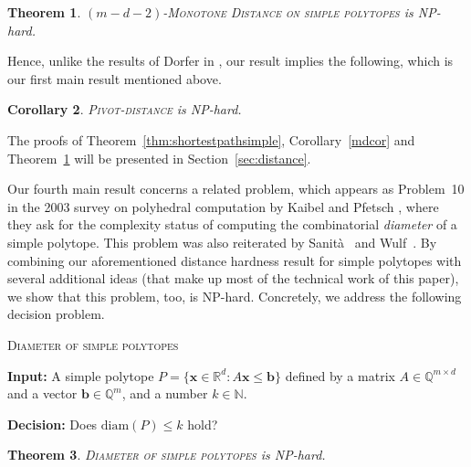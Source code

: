 \documentclass[centering,11pt,reqno]{amsart}
\newtheorem{theorem}{Theorem}[section]
\newtheorem{cor}[theorem]{Corollary}
\theoremstyle{definition}
\newcommand{\NP}{\textsc{NP}}
\begin{document}
\begin{theorem}
\label{thm:monotone}
$(m-d-2)$-\textsc{Monotone Distance on simple polytopes} is \NP-hard.
\end{theorem}
Hence, unlike the results of Dorfer in \cite{associahedronhard}, our result implies the following, which is our first main result mentioned above.

\begin{cor}
\label{cor:minimalpivots}
\textsc{Pivot-distance} is \NP-hard. 
\end{cor}

The proofs of Theorem~\ref{thm:shortestpathsimple}, Corollary~\ref{mdcor} and Theorem~\ref{thm:monotone} will be presented in Section~\ref{sec:distance}.

Our fourth main result concerns a related problem, which appears as Problem~10 in the 2003 survey on polyhedral computation by Kaibel and Pfetsch \cite{KaibelPfetschSurvey}, where they ask for the complexity status of computing the combinatorial \emph{diameter} of a simple polytope. This problem was also reiterated by Sanit\`{a}~\cite{Sanita18} and Wulf~\cite{HarderthanNPHard}. By combining our aforementioned distance hardness result for simple polytopes with several additional ideas (that make up most of the technical work of this paper), we show that this problem, too, is \NP-hard. Concretely, we address the following decision problem.

\medskip

\begin{mdframed}[innerleftmargin=0.5em, innertopmargin=0.5em, innerrightmargin=0.5em, innerbottommargin=0.5em, userdefinedwidth=0.95\linewidth, align=center]
	{\textsc{Diameter of simple polytopes}}
	\sloppy

	\noindent
	\textbf{Input:} A simple polytope $P = \{\mathbf{x}\in \mathbb{R}^d\colon A\mathbf{x}\leq \mathbf{b}\}$ defined by a matrix $A\in \mathbb{Q}^{m\times d}$ and a vector $\mathbf{b}\in \mathbb{Q}^m$, and a number $k\in\mathbb{N}$.

	\noindent
	\textbf{Decision:} Does $\mathrm{diam}(P)\le k$ hold?
\end{mdframed}

\begin{theorem}
\label{thm:combodiam}
\textsc{Diameter of simple polytopes} is \NP-hard.
\end{theorem}
\end{document}
